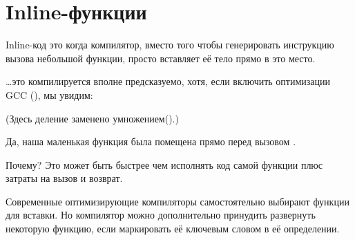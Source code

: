 \chapter{Inline-функции}
\label{inline_code}

Inline-код это когда компилятор, вместо того чтобы генерировать инструкцию вызова небольшой функции,
просто вставляет её тело прямо в это место.



\dots это компилируется вполне предсказуемо, хотя, если включить оптимизации GCC (\Othree), мы увидим:



(Здесь деление заменено умножением().)

Да, наша маленькая функция  была помещена прямо перед вызовом \printf.

Почему? Это может быть быстрее чем исполнять код самой функции плюс затраты на вызов и возврат.

Современные оптимизирующие компиляторы самостоятельно выбирают функции для вставки.
Но компилятор можно дополнительно принудить развернуть некоторую функцию, 
если маркировать её ключевым словом  в её определении.


